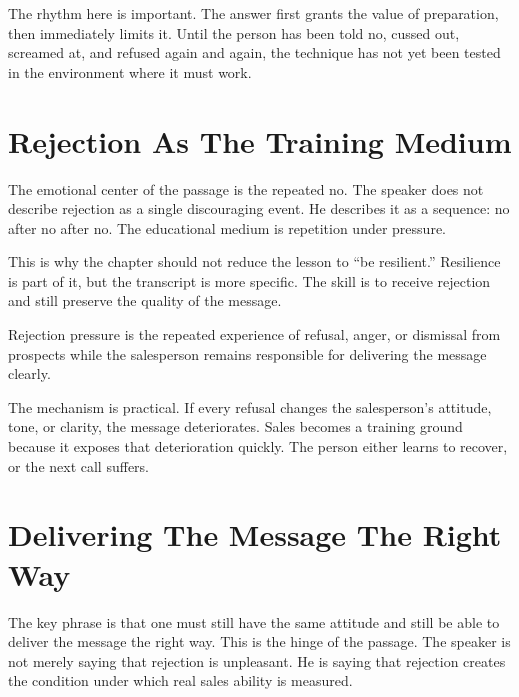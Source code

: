 The rhythm here is important. The answer first grants the value of preparation, then immediately limits it. Until the person has been told no, cussed out, screamed at, and refused again and again, the technique has not yet been tested in the environment where it must work.

\section{Rejection As The Training Medium}

The emotional center of the passage is the repeated no. The speaker does not describe rejection as a single discouraging event. He describes it as a sequence: no after no after no. The educational medium is repetition under pressure.

This is why the chapter should not reduce the lesson to ``be resilient.'' Resilience is part of it, but the transcript is more specific. The skill is to receive rejection and still preserve the quality of the message.

\begin{definition}
Rejection pressure is the repeated experience of refusal, anger, or dismissal from prospects while the salesperson remains responsible for delivering the message clearly.
\end{definition}

The mechanism is practical. If every refusal changes the salesperson's attitude, tone, or clarity, the message deteriorates. Sales becomes a training ground because it exposes that deterioration quickly. The person either learns to recover, or the next call suffers.

\section{Delivering The Message The Right Way}

The key phrase is that one must still have the same attitude and still be able to deliver the message the right way. This is the hinge of the passage. The speaker is not merely saying that rejection is unpleasant. He is saying that rejection creates the condition under which real sales ability is measured.


